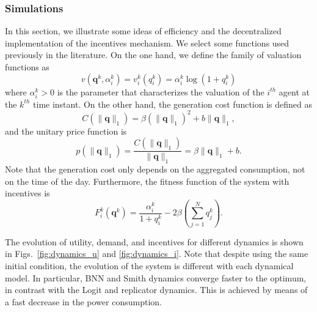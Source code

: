 \documentclass[a4paper,10pt]{article}
\def\th{^{th}}
\newcommand{\bs}[1]{\boldsymbol{#1}}
\def\th{^{th}}
\begin{document}
\subsubsection{Simulations}




In this section, we illustrate some ideas of efficiency and the decentralized implementation of the incentives mechanism. We select some functions used previously in the literature. On the one hand, we define the family of valuation functions as 
\begin{equation}\label{eq:valuation_sim}
 v(\bs{q}^k,\alpha_i^k) = v_i^k (q_i^k) = \alpha_i^k \log(1+q_i^k)
\end{equation}
where $\alpha_i^k>0$ is the parameter that characterizes the valuation of the  $i\th$ agent at the $k\th$ time instant.
On the other hand, the generation cost function is defined as 
%
\begin{equation}\label{eq:cost_sim}
 C(\|\bs{q}\|_1) = \beta ({\|\bs{q}\|_1})^2 + b {\|\bs{q}\|_1},
\end{equation}
and the unitary price function is
%
\begin{equation}\label{eq:p_sim}
 p(\|\bs{q}\|_1) = \frac{C(\|\bs{q}\|_1)}{\|\bs{q}\|_1} = \beta \|\bs{q}\|_1 + b.
\end{equation}
%
Note that the generation cost only depends on the aggregated consumption, not on the time of the day. Furthermore, 
%
the fitness function of the system with incentives is
%
\begin{equation}\label{eq:fitness_without_i_sim}
F_i^k( \bs{q}^k)  =  \frac{\alpha_i^k }{1+q_i^k}
 - 2\beta \left( \sum_{j=1}^N q_j^k  \right).
 \end{equation}


The evolution of utility, demand, and incentives for different dynamics is shown in Figs.~\ref{fig:dynamics_u} and \ref{fig:dynamics_i}. Note that despite using the same initial condition, the evolution of the system is different with each dynamical model. In particular, BNN and Smith dynamics converge faster to the  optimum, in contrast with the Logit and replicator dynamics. 
This is achieved by means of a fast decrease in the power consumption. 
\end{document}
